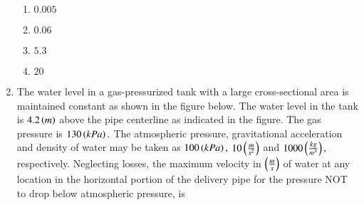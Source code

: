 \documentclass[journal,15pt,onecolumn]{IEEEtran}
\theoremstyle{remark}
\begin{document}
\begin{enumerate}[start=6]
\begin{figure}[!ht]
\label{fig:my_label}
\end{figure}
\begin{enumerate}
    \item $0.005$
    \item $0.06$
    \item $5.3$
    \item $20$
\end{enumerate}
\item The water level in a gas-pressurized tank with a large cross-sectional area is maintained constant as shown in the figure below. The water level in the tank is $4.2 \left(m\right)$ above the pipe centerline as indicated in the figure. The gas pressure is $130 \left(kPa\right).$ The atmospheric pressure, gravitational acceleration and density of water may be taken as $100 \left(kPa\right),$ $10 \left(\frac{m}{s^2}\right)$ and $1000 \left(\frac{kg}{m^3}\right),$ respectively. Neglecting losses, the maximum velocity in $\left(\frac{m}{s}\right)$ of water at any location in the horizontal portion of the delivery pipe for the pressure NOT to drop below atmospheric pressure, is
\begin{figure}[!ht]
\centering
{}
\end{figure}
\end{enumerate}
\end{document}
